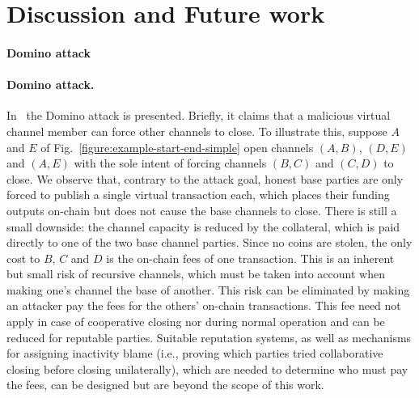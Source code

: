 \section{Discussion and Future work}
\label{sec:future-work}
\makeatletter%
%
  {\paragraph{Domino attack}}%
  {\paragraph{Domino attack.}}%
\makeatother%
In~\cite{donner} the Domino attack is presented. Briefly, it claims that a
malicious virtual channel member can force other channels to close. To
illustrate this, suppose $A$ and $E$ of
Fig.~\ref{figure:example-start-end-simple} open
channels
$(A, B)$, $(D, E)$ and $(A, E)$ with the sole intent of forcing channels $(B,
C)$ and $(C, D)$ to close. We observe that, contrary to the attack goal, honest
base parties are only
forced to publish a single virtual transaction each, which places their funding
outputs on-chain but does not cause the base channels to close. There is still a
small downside:
the channel capacity is reduced by the collateral, which
is paid directly to one of the two base channel parties. Since no coins are
stolen, the only cost to $B$, $C$ and $D$ is the on-chain fees
of one transaction. This is an inherent but small risk of
recursive channels, which must be taken into account when making one's
channel the base of another. This risk can be eliminated by making an attacker
pay the fees for the others' on-chain transactions. This fee need not apply in
case of cooperative closing nor
during normal operation and can be reduced for reputable parties.
Suitable reputation systems, as well as mechanisms for assigning inactivity
blame (i.e., proving which parties tried collaborative closing before
closing unilaterally), which are needed to determine who must pay the fees,
can be designed but are beyond the scope of this work.

